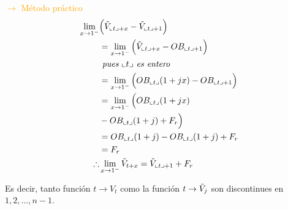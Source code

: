 \begin{multicols}{2}
    \textcolor{orange}{$\longrightarrow$ Método práctico}
    \begin{align*}
        \lim_{x\to1^-}&\Big(\Tilde{V}_{\llcorner t\lrcorner+x} - \Tilde{V}_{\llcorner t\lrcorner+1}\Big)\\
        &=\lim_{x\to1^-}\Big(\Tilde{V}_{\llcorner t\lrcorner+x} - OB_{\llcorner t\lrcorner+1}\Big)\\
        &\textit{ pues }\llcorner t\lrcorner\textit{ es entero}\\
        &=\lim_{x\to1^-}\Big(OB_{\llcorner t\lrcorner}(1+jx) - OB_{\llcorner t\lrcorner+1}\Big)\\
        &=\lim_{x\to1^-}\Big(OB_{\llcorner t\lrcorner}(1+jx) \\
        &- OB_{\llcorner t\lrcorner}(1+j)+F_r\Big)\\
        &= OB_{\llcorner t\lrcorner}(1+j) - OB_{\llcorner t\lrcorner}(1+j) + F_r\\
        &= F_r\\
        \therefore& \lim_{x\to1^-} \Tilde{V}_{t+x} = \Tilde{V}_{\llcorner t\lrcorner+1}+F_r
    \end{align*}
\end{multicols}

Es decir, tanto función $t\to V_t$ como la función $t\to\Tilde{V}_j$ son discontinues en $1,2,...,n-1$.\

